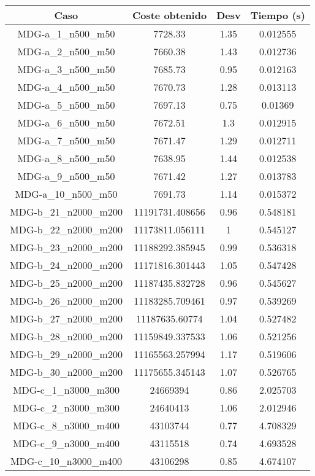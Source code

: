 \documentclass{article}
\begin{document}
\begin{table}[H]
	\centering
	\begin{tabular}{|cccc|}
		\hline
		Caso & Coste obtenido & Desv & Tiempo (s)\\ \hline
		MDG-a\_1\_n500\_m50 & 7728.33 & 1.35 & 0.012555\\
		MDG-a\_2\_n500\_m50 & 7660.38 & 1.43 & 0.012736\\
		MDG-a\_3\_n500\_m50 & 7685.73 & 0.95 & 0.012163\\
		MDG-a\_4\_n500\_m50 & 7670.73 & 1.28 & 0.013113\\
		MDG-a\_5\_n500\_m50 & 7697.13 & 0.75 & 0.01369\\
		MDG-a\_6\_n500\_m50 & 7672.51 & 1.3 & 0.012915\\
		MDG-a\_7\_n500\_m50 & 7671.47 & 1.29 & 0.012711\\
		MDG-a\_8\_n500\_m50 & 7638.95 & 1.44 & 0.012538\\
		MDG-a\_9\_n500\_m50 & 7671.42 & 1.27 & 0.013783\\
		MDG-a\_10\_n500\_m50 & 7691.73 & 1.14 & 0.015372\\
		MDG-b\_21\_n2000\_m200 & 11191731.408656 & 0.96 & 0.548181\\
		MDG-b\_22\_n2000\_m200 & 11173811.056111 & 1 & 0.545127\\
		MDG-b\_23\_n2000\_m200 & 11188292.385945 & 0.99 & 0.536318\\
		MDG-b\_24\_n2000\_m200 & 11171816.301443 & 1.05 & 0.547428\\
		MDG-b\_25\_n2000\_m200 & 11187435.832728 & 0.96 & 0.545627\\
		MDG-b\_26\_n2000\_m200 & 11183285.709461 & 0.97 & 0.539269\\
		MDG-b\_27\_n2000\_m200 & 11187635.60774 & 1.04 & 0.527482\\
		MDG-b\_28\_n2000\_m200 & 11159849.337533 & 1.06 & 0.521256\\
		MDG-b\_29\_n2000\_m200 & 11165563.257994 & 1.17 & 0.519606\\
		MDG-b\_30\_n2000\_m200 & 11175655.345143 & 1.07 & 0.526765\\
		MDG-c\_1\_n3000\_m300 & 24669394 & 0.86 & 2.025703\\
		MDG-c\_2\_n3000\_m300 & 24640413 & 1.06 & 2.012946\\
		MDG-c\_8\_n3000\_m400 & 43103744 & 0.77 & 4.708329\\
		MDG-c\_9\_n3000\_m400 & 43115518 & 0.74 & 4.693528\\
		MDG-c\_10\_n3000\_m400 & 43106298 & 0.85 & 4.674107\\

\end{tabular}
\end{table}
\end{document}
